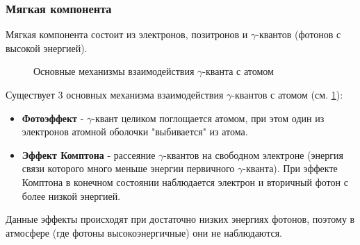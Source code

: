 \documentclass[a4paper,12pt]{article} %
\begin{document}
\subsubsection{Мягкая компонента}
Мягкая компонента состоит из электронов, позитронов и $\gamma$-квантов (фотонов с высокой энергией). \\
\begin{figure}[h!]
\caption{Основные механизмы взаимодействия $\gamma$-кванта с атомом}
\label{мягкая}
\end{figure}
Существует 3 основных механизма взаимодействия $\gamma$-квантов с атомом (см. \ref{мягкая}):
\begin{itemize}
    \item\textbf{ Фотоэффект} - $\gamma$-квант целиком поглощается атомом, при этом один из электронов атомной оболочки "выбивается" из атома. 
    \item \textbf{Эффект Комптона} - рассеяние $\gamma$-квантов на свободном электроне (энергия связи которого много меньше энергии первичного $\gamma$-кванта). При эффекте Комптона в конечном состоянии наблюдается электрон и вторичный фотон с более низкой энергией.
\end{itemize}
Данные эффекты происходят при достаточно низких энергиях фотонов, поэтому в атмосфере (где фотоны высокоэнергичные) они не наблюдаются. 
\end{document}
